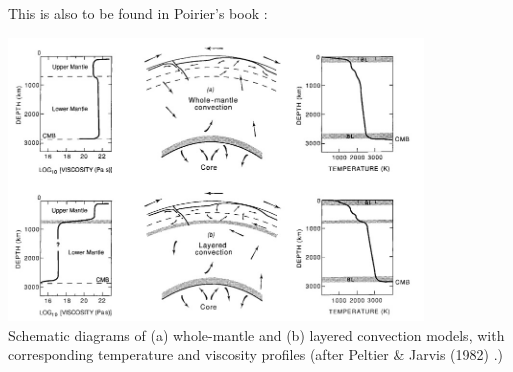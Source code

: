 This is also to be found in Poirier's book \cite{poirier}:
\begin{center}
\includegraphics[width=11cm]{images/adiabatic/poirier}\\
{\captionfont Schematic diagrams of (a) whole-mantle and (b) layered convection
models, with corresponding temperature and viscosity profiles (after 
Peltier \& Jarvis (1982) \cite{peja82}.)}
\end{center}


